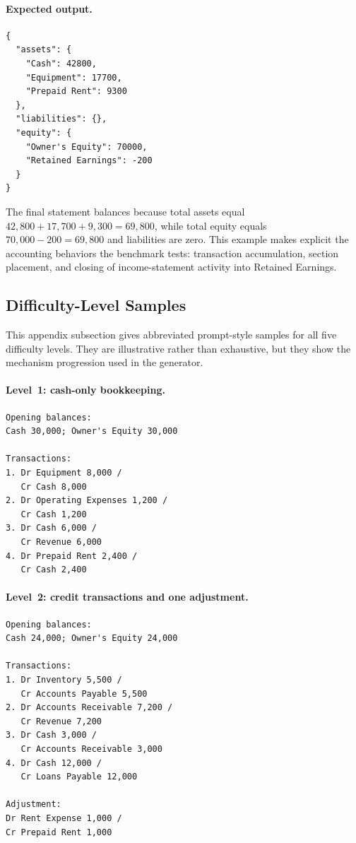 \paragraph{Expected output.}
\begin{verbatim}
{
  "assets": {
    "Cash": 42800,
    "Equipment": 17700,
    "Prepaid Rent": 9300
  },
  "liabilities": {},
  "equity": {
    "Owner's Equity": 70000,
    "Retained Earnings": -200
  }
}
\end{verbatim}

The final statement balances because total assets equal
\(42{,}800 + 17{,}700 + 9{,}300 = 69{,}800\), while total equity
equals \(70{,}000 - 200 = 69{,}800\) and liabilities are zero.
This example makes explicit the accounting behaviors the benchmark
tests: transaction accumulation, section placement, and closing of
income-statement activity into Retained Earnings.

\subsection{Difficulty-Level Samples}
\label{app:difficulty-samples}

This appendix subsection gives abbreviated prompt-style samples for all
five difficulty levels.
They are illustrative rather than exhaustive, but they show the
mechanism progression used in the generator.

\paragraph{Level~1: cash-only bookkeeping.}
\begin{verbatim}
Opening balances:
Cash 30,000; Owner's Equity 30,000

Transactions:
1. Dr Equipment 8,000 /
   Cr Cash 8,000
2. Dr Operating Expenses 1,200 /
   Cr Cash 1,200
3. Dr Cash 6,000 /
   Cr Revenue 6,000
4. Dr Prepaid Rent 2,400 /
   Cr Cash 2,400
\end{verbatim}

\paragraph{Level~2: credit transactions and one adjustment.}
\begin{verbatim}
Opening balances:
Cash 24,000; Owner's Equity 24,000

Transactions:
1. Dr Inventory 5,500 /
   Cr Accounts Payable 5,500
2. Dr Accounts Receivable 7,200 /
   Cr Revenue 7,200
3. Dr Cash 3,000 /
   Cr Accounts Receivable 3,000
4. Dr Cash 12,000 /
   Cr Loans Payable 12,000

Adjustment:
Dr Rent Expense 1,000 /
Cr Prepaid Rent 1,000
\end{verbatim}

